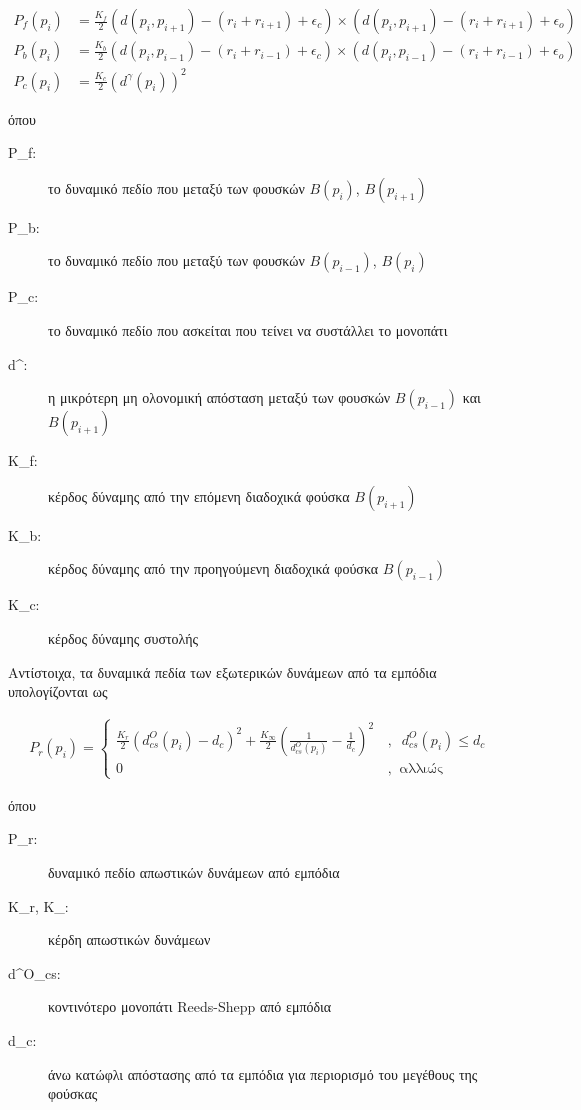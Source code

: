 \begin{align}
		P_f(p_i) &= \frac{K_f}{2}(d(p_i,p_{i+1}) - (r_i+r_{i+1}) + \epsilon_c) \times (d(p_i,p_{i+1}) - (r_i+r_{i+1}) + \epsilon_o)\\[0.5cm]
		P_b(p_i) &= \frac{K_b}{2}(d(p_i,p_{i-1}) - (r_i+r_{i-1}) + \epsilon_c) \times (d(p_i,p_{i-1}) - (r_i+r_{i-1}) + \epsilon_o)\\[0.5cm]
		P_c(p_i) &= \frac{K_c}{2}(d^\gamma(p_i))^2
\end{align}

\noindent όπου
\begin{description}
	\item[P_f:] το δυναμικό πεδίο που μεταξύ των φουσκών $B(p_i)$, $B(p_{i+1})$
	\item[P_b:] το δυναμικό πεδίο που μεταξύ των φουσκών $B(p_{i-1})$, $B(p_i)$
	\item[P_c:] το δυναμικό πεδίο που ασκείται που τείνει να συστάλλει το μονοπάτι 
	\item[d^\gamma:] η μικρότερη μη ολονομική απόσταση μεταξύ των φουσκών $Β(p_{i-1})$ και $Β(p_{i+1})$
	\item[K_f:] κέρδος δύναμης από την επόμενη διαδοχικά φούσκα $B(p_{i+1})$
	\item[K_b:] κέρδος δύναμης από την προηγούμενη διαδοχικά φούσκα $B(p_{i-1})$
	\item[K_c:] κέρδος δύναμης συστολής
\end{description}

\noindent Αντίστοιχα, τα δυναμικά πεδία των εξωτερικών δυνάμεων από τα εμπόδια \cite{dpm_phd} υπολογίζονται ως

\begin{align}
	P_r(p_i) =
	\begin{cases}
		\frac{K_r}{2} (d^O_{cs}(p_i) - d_c)^2 + \frac{K_{\infty}}{2} (\frac{1}{d^O_{cs}(p_i)} - \frac{1}{d_c})^2 \, &,\;\;  d^O_{cs}(p_i) \leq d_c\\[0.3cm]
		0 &,\;\; \text{αλλιώς}
	\end{cases}
\end{align}

\noindent όπου
\begin{description}
	\item[P_r:] δυναμικό πεδίο απωστικών δυνάμεων από εμπόδια
	\item[K_r, K_{\infty}:] κέρδη απωστικών δυνάμεων
	\item[d^O_{cs}:] κοντινότερο μονοπάτι Reeds-Shepp από εμπόδια
	\item[d_c:] άνω κατώφλι απόστασης από τα εμπόδια για περιορισμό του μεγέθους της φούσκας
\end{description}

